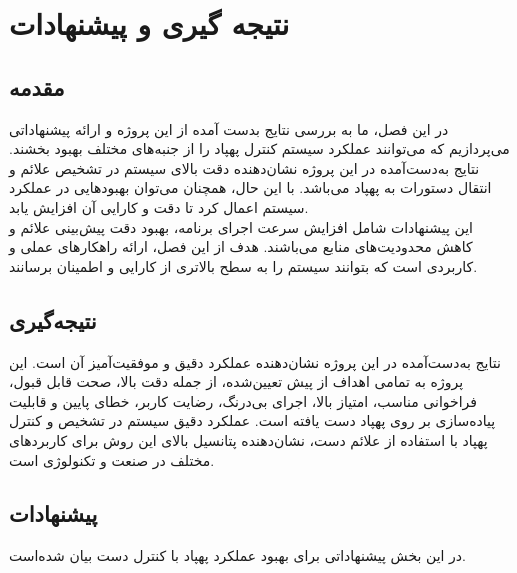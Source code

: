 \chapter{نتیجه گیری و پیشنهادات}
\section{مقدمه}
در این فصل، ما به بررسی نتایج بدست آمده از این پروژه و ارائه پیشنهاداتی می‌پردازیم که می‌توانند عملکرد سیستم کنترل پهپاد را از جنبه‌های مختلف بهبود بخشند. نتایج به‌دست‌آمده در این پروژه نشان‌دهنده دقت بالای سیستم در تشخیص علائم و انتقال دستورات به پهپاد می‌باشد. با این حال، همچنان می‌توان بهبودهایی در عملکرد سیستم اعمال کرد تا دقت و کارایی آن افزایش یابد.
\\
این پیشنهادات شامل افزایش سرعت اجرای برنامه، بهبود دقت پیش‌بینی علائم و کاهش محدودیت‌های منابع می‌باشند. هدف از این فصل، ارائه راهکارهای عملی و کاربردی است که بتوانند سیستم را به سطح بالاتری از کارایی و اطمینان برسانند.


\section{نتیجه‌گیری}
نتایج به‌دست‌آمده در این پروژه نشان‌دهنده عملکرد دقیق و موفقیت‌آمیز آن است. این پروژه به تمامی اهداف از پیش تعیین‌شده، از جمله دقت بالا، صحت قابل قبول، فراخوانی مناسب، امتیاز  بالا، اجرای بی‌درنگ، رضایت کاربر، خطای پایین و قابلیت پیاده‌سازی بر روی پهپاد دست یافته است. عملکرد دقیق سیستم در تشخیص و کنترل پهپاد با استفاده از علائم دست، نشان‌دهنده پتانسیل بالای این روش برای کاربردهای مختلف در صنعت و تکنولوژی است.


\section{پیشنهادات}
در این بخش پیشنهاداتی برای بهبود عملکرد پهپاد با کنترل دست بیان شده‌است.
